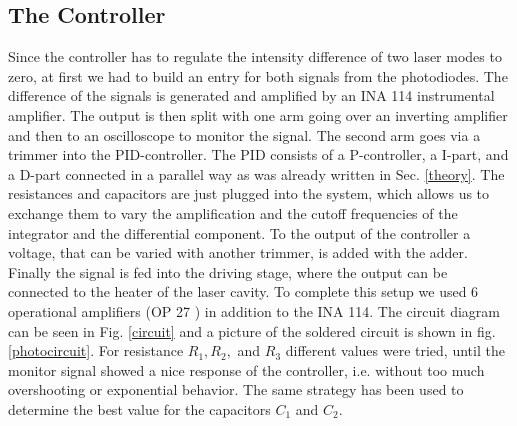 \documentclass[a4paper,10pt]{article}
\begin{document}
\subsection{The Controller}
Since the controller has to regulate the intensity difference of two laser modes to zero, at first we had to build an entry for both signals from the photodiodes. The difference of the signals is generated and amplified by an INA 114 \cite{ina114} instrumental amplifier. The output is then split with one arm going over an inverting amplifier and then to an oscilloscope to monitor the signal. The second arm goes via a trimmer into the PID-controller.
\newline
The PID consists of a P-controller, a I-part, and a D-part connected in a parallel way as was already written in Sec. \ref{theory}. The resistances and capacitors are just plugged into the system, which allows us to exchange them to vary the amplification and the cutoff frequencies of the integrator and the differential component. To the output of the controller a voltage, that can be varied with another trimmer, is added with the adder. Finally the signal is fed into the driving stage, where the output can be connected to the heater of the laser cavity. To complete this setup we used 6 operational amplifiers (OP 27 \cite{op27}) in addition to the INA 114. The circuit diagram can be seen in Fig. \ref{circuit} and a picture of the soldered circuit is shown in fig. \ref{photocircuit}.
For resistance $R_1,R_2,$ and $R_3$ different values were tried, until the monitor signal showed a nice response of the controller, i.e. without too much overshooting or exponential behavior. The same strategy has been used to determine the best value for the capacitors $C_1$ and $C_2$.
\end{document}
